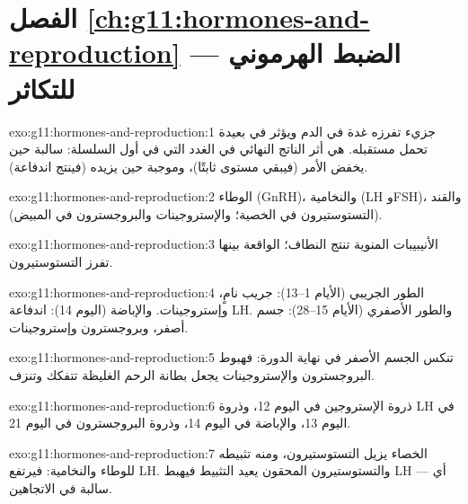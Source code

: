 \section*{الفصل \ref{ch:g11:hormones-and-reproduction} --- الضبط الهرموني للتكاثر}

\begin{solution}{exo:g11:hormones-and-reproduction:1}
 جزيء تفرزه غدة في الدم ويؤثر في  بعيدة تحمل مستقبله.
 هي أثر الناتج النهائي في الغدد التي في أول السلسلة:
سالبة حين يخفض الأمر (فيبقي مستوى ثابتًا)، وموجبة حين يزيده (فينتج
اندفاعة).
\end{solution}

\begin{solution}{exo:g11:hormones-and-reproduction:2}
الوطاء (GnRH)، والنخامية (LH وFSH)، والقند (التستوستيرون في الخصية؛
والإستروجينات والبروجسترون في المبيض).
\end{solution}

\begin{solution}{exo:g11:hormones-and-reproduction:3}
الأنيبيبات المنوية تنتج النطاف؛  الواقعة بينها تفرز
التستوستيرون.
\end{solution}

\begin{solution}{exo:g11:hormones-and-reproduction:4}
الطور الجريبي (الأيام 1--13): جريب نامٍ، وإستروجينات. والإباضة (اليوم
14): اندفاعة LH. والطور الأصفري (الأيام 15--28): جسم أصفر،
وبروجسترون وإستروجينات.
\end{solution}

\begin{solution}{exo:g11:hormones-and-reproduction:5}
تنكس الجسم الأصفر في نهاية الدورة: فهبوط البروجسترون والإستروجينات
يجعل بطانة الرحم الغليظة تتفكك وتنزف.
\end{solution}

\begin{solution}{exo:g11:hormones-and-reproduction:6}
ذروة الإستروجين في اليوم 12، وذروة LH في اليوم 13، والإباضة في اليوم
14، وذروة البروجسترون في اليوم 21.
\end{solution}

\begin{solution}{exo:g11:hormones-and-reproduction:7}
الخصاء يزيل التستوستيرون، ومنه تثبيطه للوطاء والنخامية: فيرتفع LH.
والتستوستيرون المحقون يعيد التثبيط فيهبط LH --- أي  سالبة
في الاتجاهين.
\end{solution}

